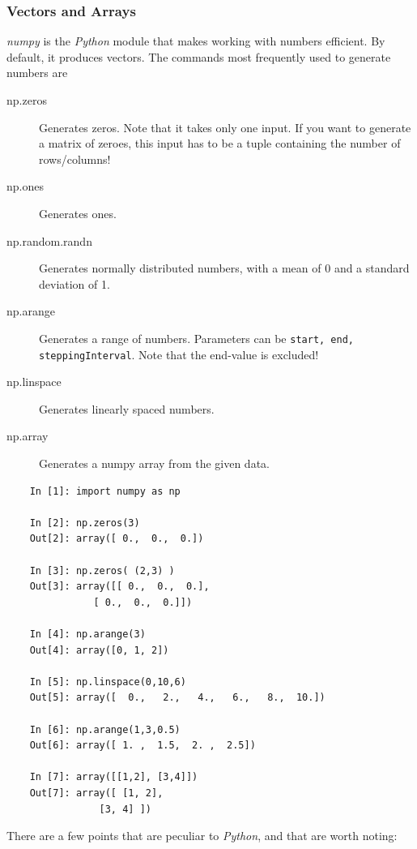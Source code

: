 \subsubsection{Vectors and Arrays}

\emph{numpy} is the \emph{Python} module that makes working with numbers efficient. By default, it produces vectors. The commands most frequently used to generate numbers are

\begin{description}
  \item[np.zeros] Generates zeros. Note that it takes only one input. If you want to generate a matrix of zeroes, this input has to be a tuple containing the number of rows/columns!
  \item[np.ones] Generates ones.
  \item[np.random.randn] Generates normally distributed numbers, with a mean of 0 and a standard deviation of 1.
  \item[np.arange] Generates a range of numbers. Parameters can be \lstinline{start, end, steppingInterval}. Note that the end-value is excluded!
  \item[np.linspace] Generates linearly spaced numbers.
  \item[np.array] Generates a numpy array from the given data.
\end{description}

\begin{lstlisting}
    In [1]: import numpy as np

    In [2]: np.zeros(3)
    Out[2]: array([ 0.,  0.,  0.])

    In [3]: np.zeros( (2,3) )
    Out[3]: array([[ 0.,  0.,  0.],
               [ 0.,  0.,  0.]])

    In [4]: np.arange(3)
    Out[4]: array([0, 1, 2])

    In [5]: np.linspace(0,10,6)
    Out[5]: array([  0.,   2.,   4.,   6.,   8.,  10.])

    In [6]: np.arange(1,3,0.5)
    Out[6]: array([ 1. ,  1.5,  2. ,  2.5])

    In [7]: array([[1,2], [3,4]])
    Out[7]: array([ [1, 2],
                [3, 4] ])
\end{lstlisting}

There are a few points that are peculiar to \emph{Python}, and that are worth noting:

